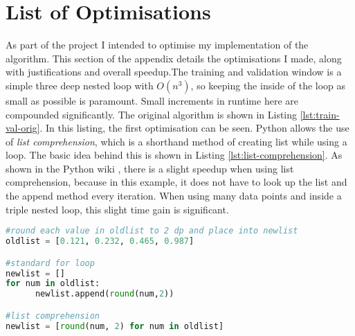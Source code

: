 \documentclass[ oneside,%
                    author={Joshua Felmeden},
                    degree={MEng},
                     title={Sentiment Analysis of Financial Headlines Based on Realised Stock Returns},
                  subtitle={Research}]{dissertation}
\begin{document}


\chapter{List of Optimisations}
\label{appx:optimisations}
As part of the project I intended to optimise my implementation of the algorithm. This section of the appendix details the optimisations I made, along with justifications and overall speedup.The training and validation window is a simple three deep nested loop with $O(n^3)$, so keeping the inside of the loop as small as possible is paramount. Small increments in runtime here are compounded significantly. The original algorithm is shown in Listing \ref{lst:train-val-orig}. In this listing, the first optimisation can be seen. Python allows the use of \textit{list comprehension}, which is a shorthand method of creating list while using a loop. The basic idea behind this is shown in Listing \ref{lst:list-comprehension}. As shown in the Python wiki \cite{list-comprehension}, there is a slight speedup when using list comprehension, because in this example, it does not have to look up the list and the append method every iteration. When using many data points and inside a triple nested loop, this slight time gain is significant.

\begin{lstlisting}[float={!htb},caption={List comprehension example},label={lst:list-comprehension},language=Python]
#round each value in oldlist to 2 dp and place into newlist
oldlist = [0.121, 0.232, 0.465, 0.987]

#standard for loop
newlist = []
for num in oldlist:
      newlist.append(round(num,2))

#list comprehension
newlist = [round(num, 2) for num in oldlist]
\end{lstlisting}
\end{document}
